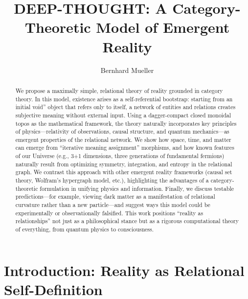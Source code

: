 \documentclass{article}
\title{DEEP-THOUGHT: A Category-Theoretic Model of Emergent Reality}
\author{Bernhard Mueller}
\begin{document}
\maketitle

\begin{abstract}
We propose a maximally simple, relational theory of reality grounded in category theory. In this model, existence arises as a self-referential bootstrap: starting from an initial void'' object that refers only to itself, a network of entities and relations creates subjective meaning without external input. Using a dagger-compact closed monoidal topos as the mathematical framework, the theory naturally incorporates key principles of physics---relativity of observations, causal structure, and quantum mechanics---as emergent properties of the relational network. We show how space, time, and matter can emerge from ``iterative meaning assignment'' morphisms, and how known features of our Universe (e.g., 3+1 dimensions, three generations of fundamental fermions) naturally result from optimizing symmetry, integration, and entropy in the relational graph. We contrast this approach with other emergent reality frameworks (causal set theory, Wolfram's hypergraph model, etc.), highlighting the advantages of a category-theoretic formulation in unifying physics and information. Finally, we
 discuss testable predictions---for example, viewing dark matter as a manifestation of relational curvature rather than a new particle---and suggest ways this model could be experimentally or observationally falsified. This work positions ``reality as relationships'' not just as a philosophical stance but as a rigorous computational theory of everything, from quantum physics to consciousness.

\end{abstract}

\section{Introduction: Reality as Relational Self-Definition}
\end{document}
